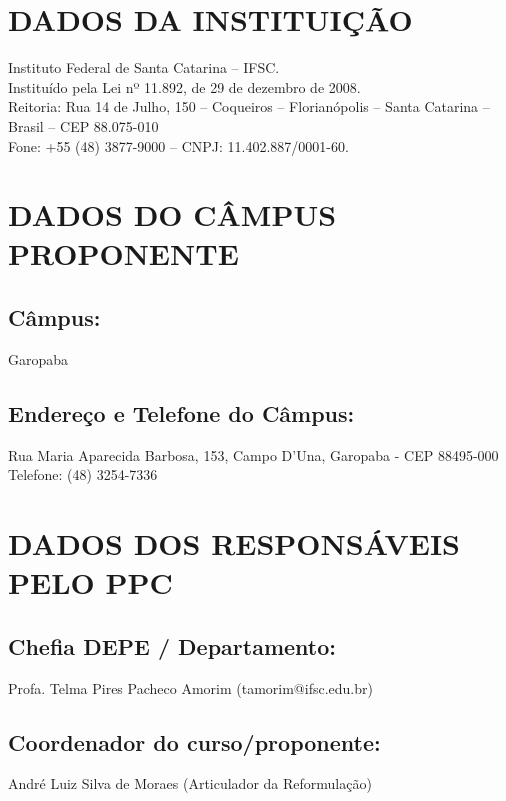 \documentclass{../../modelos/latex-shared/ifsc-ppc}
\begin{document}

\tableofcontents
\newpage

\section{DADOS DA INSTITUIÇÃO}
Instituto Federal de Santa Catarina -- IFSC. \\
Instituído pela Lei nº 11.892, de 29 de dezembro de 2008. \\
Reitoria: Rua 14 de Julho, 150 -- Coqueiros -- Florianópolis -- Santa Catarina -- Brasil -- CEP 88.075-010 \\
Fone: +55 (48) 3877-9000 -- CNPJ: 11.402.887/0001-60.

\section{DADOS DO CÂMPUS PROPONENTE}
\subsection{Câmpus:}
Garopaba

\subsection{Endereço e Telefone do Câmpus:}
Rua Maria Aparecida Barbosa, 153, Campo D'Una, Garopaba - CEP 88495-000 \\
Telefone: (48) 3254-7336

\section{DADOS DOS RESPONSÁVEIS PELO PPC}
\subsection{Chefia DEPE / Departamento:}
Profa. Telma Pires Pacheco Amorim (tamorim@ifsc.edu.br)

\subsection{Coordenador do curso/proponente:}
André Luiz Silva de Moraes (Articulador da Reformulação)
\end{document}
